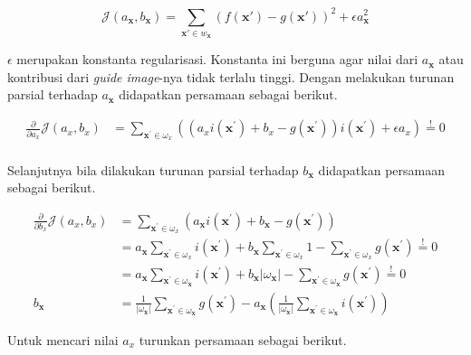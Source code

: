 \documentclass[11pt, a4paper, final]{report}
\begin{document}
$$
\mathcal{J}(a_{\bm{x}}, b_{\bm{x}}) = \sum_{\bm{x}'\in w_{\bm{x}}} (f(\bm{x}') - g(\bm{x}'))^2 + \epsilon a_{\bm{x}}^2
$$

$\epsilon$ merupakan konstanta regularisasi. Konstanta ini berguna agar nilai dari $a_{\bm{x}}$ atau kontribusi dari \textit{guide image}-nya tidak terlalu tinggi. Dengan melakukan turunan parsial terhadap $a_{\bm{x}}$ didapatkan persamaan sebagai berikut.

$$
\begin{aligned}
\frac{\partial}{\partial a_{x}} \mathcal{J}\left(a_{x}, b_{x}\right) &=\sum_{\boldsymbol{x}^{\prime} \in \omega_{x}}\left(\left(a_{x} i\left(\boldsymbol{x}^{\prime}\right)+b_{x}-g\left(\boldsymbol{x}^{\prime}\right)\right) i\left(\boldsymbol{x}^{\prime}\right)+\epsilon a_{x}\right) \stackrel{!}{=} 0 \\
\end{aligned}
$$

Selanjutnya bila dilakukan turunan parsial terhadap $b_{\bm{x}}$ didapatkan persamaan sebagai berikut.

$$
\begin{aligned}
\frac{\partial}{\partial b_{x}} \mathcal{J}\left(a_{x}, b_{x}\right) &=\sum_{\boldsymbol{x}^{\prime} \in \omega_{x}}\left(a_{\boldsymbol{x}} i\left(\boldsymbol{x}^{\prime}\right)+b_{\boldsymbol{x}}-g\left(\boldsymbol{x}^{\prime}\right)\right) \\
&=a_{\boldsymbol{x}} \sum_{\boldsymbol{x}^{\prime} \in \omega_{x}} i\left(\boldsymbol{x}^{\prime}\right)+b_{\boldsymbol{x}} \sum_{\boldsymbol{x}^{\prime} \in \omega_{x}} 1-\sum_{\boldsymbol{x}^{\prime} \in \omega_{x}} g\left(\boldsymbol{x}^{\prime}\right) \stackrel{!}{=} 0 \\
&=a_{\boldsymbol{x}} \sum_{\boldsymbol{x}^{\prime} \in \omega_{\boldsymbol{x}}} i\left(\boldsymbol{x}^{\prime}\right)+b_{\boldsymbol{x}}\left|\omega_{\boldsymbol{x}}\right|-\sum_{\boldsymbol{x}^{\prime} \in \omega_{\boldsymbol{x}}} g\left(\boldsymbol{x}^{\prime}\right) \stackrel{!}{=} 0 \\
b_{\boldsymbol{x}}&=\frac{1}{\left|\omega_{\boldsymbol{x}}\right|} \sum_{\boldsymbol{x}^{\prime} \in \omega_{\boldsymbol{x}}} g\left(\boldsymbol{x}^{\prime}\right)-a_{\boldsymbol{x}}\left(\frac{1}{\left|\omega_{\boldsymbol{x}}\right|} \sum_{\boldsymbol{x}^{\prime} \in \omega_{\boldsymbol{x}}} i\left(\boldsymbol{x}^{\prime}\right)\right)
\end{aligned}
$$

Untuk mencari nilai $a_{x}$ turunkan persamaan sebagai berikut.
\end{document}
